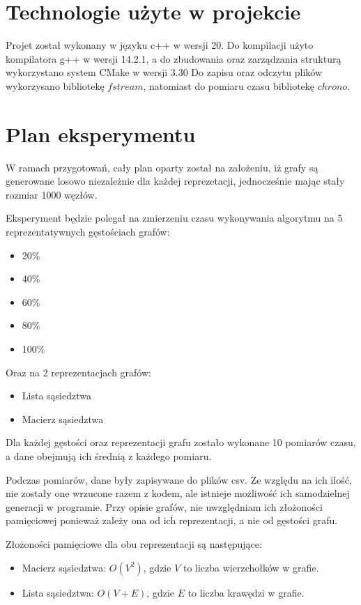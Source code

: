 \documentclass{article}
\begin{document}
\section{Technologie użyte w projekcie}
Projet został wykonany w języku c++ w wersji 20. Do kompilacji użyto kompilatora g++ w wersji 14.2.1, 
a do zbudowania oraz zarządzania strukturą wykorzystano system CMake w wersji 3.30
Do zapisu oraz odczytu plików wykorzysano bibliotekę $fstream$, natomiast do pomiaru czasu bibliotekę $chrono$.

\section{Plan eksperymentu}

W ramach przygotowań, cały plan oparty został na założeniu, iż grafy są generowane losowo niezależnie dla każdej reprezetacji, jednocześnie mając stały rozmiar 1000 węzłów.

Eksperyment będzie polegał na zmierzeniu czasu wykonywania algorytmu na 5 reprezentatywnych gęstościach grafów:
\begin{itemize}
    \item 20\%
    \item 40\%
    \item 60\%
    \item 80\%
    \item 100\%
\end{itemize}

Oraz na 2 reprezentacjach grafów:
\begin{itemize}
    \item Lista sąsiedztwa
    \item Macierz sąsiedztwa
\end{itemize}

Dla każdej gęstości oraz reprezentacji grafu zostało wykonane 10 pomiarów czasu, a dane obejmują ich średnią z każdego pomiaru.

Podczas pomiarów, dane były zapisywane do plików csv. Ze względu na ich ilość, nie zostały one wrzucone razem z kodem, ale istnieje możliwość ich samodzielnej generacji w programie.
Przy opisie grafów, nie uwzględniam ich złożoności pamięciowej ponieważ zależy ona od ich reprezentacji, a nie od gęstości grafu. 

Złożoności pamięciowe dla obu reprezentacji są następujące:
\begin{itemize}
    \item Macierz sąsiedztwa: $O(V^2)$, gdzie $V$ to liczba wierzchołków w grafie.
    \item Lista sąsiedztwa: $O(V + E)$, gdzie $E$ to liczba krawędzi w grafie.
\end{itemize}
\end{document}
